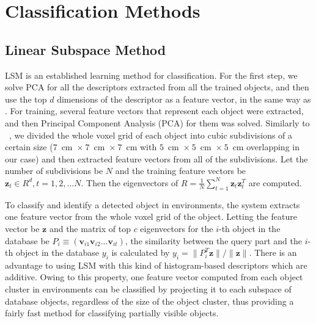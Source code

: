 \documentclass[a4paper, 10 pt, conference]{sty/ieeeconf}
\begin{document}
\section{Classification Methods}
\label{sec:classification}

\subsection{Linear Subspace Method}
\label{sec:subspace}
LSM is an established learning method for classification. 
For the first step, we solve PCA for all the descriptors extracted from all the trained objects, 
and then use the top $d$ dimensions of the descriptor as a feature vector, in the same way as \cite{kanezaki2011icra}.
For training, several feature vectors that represent each object were extracted, 
and then Principal Component Analysis (PCA) for them was solved. 
Similarly to ~\cite{kanezaki2011icra}, we divided the whole voxel grid of each object into 
cubic subdivisions of a certain size ($7$~cm~$\times~7$~cm~$\times~7$~cm with $5$~cm~$\times~5$~cm~$\times~5$~cm overlapping in our case) and then extracted feature vectors from all of the subdivisions. 
Let the number of subdivisions be $N$ 
and the training feature vectors be $\bm{z}_t \in R^d, t=1,2,...N$. 
Then the eigenvectors of $R=\frac{1}{N} \sum^{N}_{t=1} \bm{z}_t \bm{z}_t^T$ are computed. 

To classify and identify a detected object in environments, the system extracts one feature vector from the whole voxel grid of the object. 
Letting the feature vector be $\bm{z}$ and the matrix of top $c$ eigenvectors for the $i$-th object in the database be $P_i \equiv (\bm{v}_{i1} \bm{v}_{i2} ... \bm{v}_{it})$,
the similarity between the query part and the $i$-th object in the database $y_i$ is calculated by 
$y_i = \| P_i^T \bm{z} \|/\| \bm{z} \|$.
There is an advantage to using LSM with this kind of histogram-based descriptors which are additive. 
Owing to this property, one feature vector computed from each object cluster in environments can be classified by projecting it to 
each subspace of database objects, regardless of the size of the object cluster, thus providing a fairly fast method for classifying partially visible objects.
\end{document}
